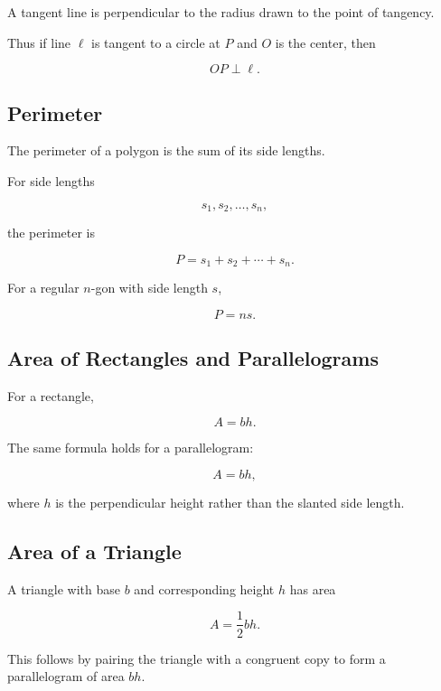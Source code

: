 A tangent line is perpendicular to the radius drawn to the point of
tangency.

Thus if line \(\ell\) is tangent to a circle at \(P\) and \(O\) is the
center, then

\[ \boxed{OP\perp\ell.} \]

\subsection{Perimeter}
\label{subsec:perimeter}

The perimeter of a polygon is the sum of its side lengths.

For side lengths

\[ s_1,s_2,\ldots,s_n, \]

the perimeter is

\[ \boxed{P=s_1+s_2+\cdots+s_n.} \]

For a regular \(n\)-gon with side length \(s\),

\[ \boxed{P=ns.} \]

\subsection{Area of Rectangles and Parallelograms}
\label{subsec:rectangle-parallelogram-area}

For a rectangle,

\[ \boxed{A=bh.} \]

The same formula holds for a parallelogram:

\[ \boxed{A=bh,} \]

where \(h\) is the perpendicular height rather than the slanted side length.

\subsection{Area of a Triangle}
\label{subsec:triangle-area}

A triangle with base \(b\) and corresponding height \(h\) has area

\[ \boxed{A=\frac12bh.} \]

This follows by pairing the triangle with a congruent copy to form a
parallelogram of area \(bh\).

